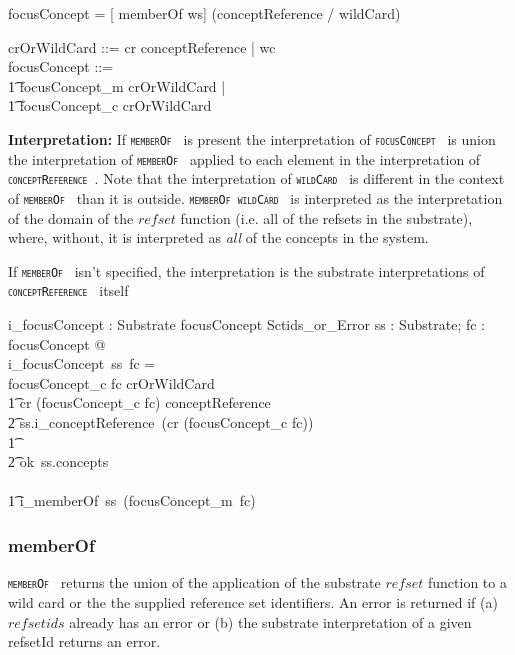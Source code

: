 \documentclass{article}
\def\spec#1{{\tt \small \textsc{{#1}} }}
\def\bnf#1{{\scriptsize {{#1}} }}
\begin{document}
\begin{framed}
\bnf{focusConcept = [ memberOf ws] (conceptReference / wildCard)} 
\end{framed}

\begin{zed}
crOrWildCard ::= cr \ldata conceptReference \rdata | wc  \\
focusConcept ::= \\
\t1 focusConcept\_m \ldata crOrWildCard \rdata | \\
\t1 focusConcept\_c \ldata crOrWildCard \rdata
\end{zed}


\textbf{Interpretation:}  If  \spec{memberOf} is present the interpretation of  \spec{focusConcept} is union the interpretation of \spec{memberOf} applied to
each element in the interpretation of \spec{conceptReference}.  Note that the interpretation of \spec{wildCard} is different in the context of \spec{memberOf} than
it is outside.  \spec{memberOf wildCard} is interpreted as the interpretation of the domain of the $refset$ function (i.e. all of the refsets in the substrate), where, without,
it is interpreted as \emph{all} of the concepts in the system.

  If \spec{memberOf} isn't specified, the interpretation is the substrate interpretations of \spec{conceptReference} itself

\begin{axdef}
   i\_focusConcept : Substrate \fun focusConcept \fun Sctids\_or\_Error 
\where
   \forall ss : Substrate; fc : focusConcept @ \\
i\_focusConcept~ss~fc = \\
\IF focusConcept\_c \inv fc \in crOrWildCard \THEN \\
\t1 \IF cr \inv (focusConcept\_c \inv fc) \in conceptReference \THEN \\
\t2 ss.i\_conceptReference~(cr \inv (focusConcept\_c \inv fc)) \\
\t1 \ELSE \\
\t2 ok~ss.concepts \\
 \ELSE \\
\t1  i\_memberOf~ss~(focusConcept\_m~\inv fc)
\end{axdef}

\subsubsection{memberOf}
\spec{memberOf} returns the union of the application of the substrate $refset$ function to a wild card or the  the supplied reference set identifiers.  An error is
returned if (a) $refsetids$ already has an error or (b) the substrate interpretation of a given refsetId returns an error.
\end{document}
